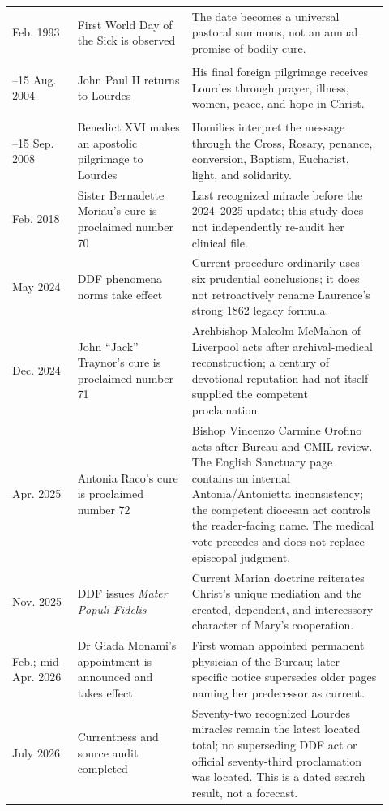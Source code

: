 \begin{longtable}{>{\bfseries\raggedright\arraybackslash}p{0.16\linewidth}>{\raggedright\arraybackslash}p{0.28\linewidth}>{\raggedright\arraybackslash}p{0.48\linewidth}}
11 Feb. 1993 & First World Day of the Sick is observed & The date becomes a universal pastoral summons, not an annual promise of bodily cure.\\
14--15 Aug. 2004 & John Paul II returns to Lourdes & His final foreign pilgrimage receives Lourdes through prayer, illness, women, peace, and hope in Christ.\\
13--15 Sep. 2008 & Benedict XVI makes an apostolic pilgrimage to Lourdes & Homilies interpret the message through the Cross, Rosary, penance, conversion, Baptism, Eucharist, light, and solidarity.\\
11 Feb. 2018 & Sister Bernadette Moriau's cure is proclaimed number 70 & Last recognized miracle before the 2024--2025 update; this study does not independently re-audit her clinical file.\\
19 May 2024 & DDF phenomena norms take effect & Current procedure ordinarily uses six prudential conclusions; it does not retroactively rename Laurence's strong 1862 legacy formula.\\
8 Dec. 2024 & John “Jack” Traynor's cure is proclaimed number 71 & Archbishop Malcolm McMahon of Liverpool acts after archival-medical reconstruction; a century of devotional reputation had not itself supplied the competent proclamation.\\
16 Apr. 2025 & Antonia Raco's cure is proclaimed number 72 & Bishop Vincenzo Carmine Orofino acts after Bureau and CMIL review. The English Sanctuary page contains an internal Antonia/Antonietta inconsistency; the competent diocesan act controls the reader-facing name. The medical vote precedes and does not replace episcopal judgment.\\
4 Nov. 2025 & DDF issues \emph{Mater Populi Fidelis} & Current Marian doctrine reiterates Christ's unique mediation and the created, dependent, and intercessory character of Mary's cooperation.\\
17 Feb.; mid-Apr. 2026 & Dr Giada Monami's appointment is announced and takes effect & First woman appointed permanent physician of the Bureau; later specific notice supersedes older pages naming her predecessor as current.\\
16 July 2026 & Currentness and source audit completed & Seventy-two recognized Lourdes miracles remain the latest located total; no superseding DDF act or official seventy-third proclamation was located. This is a dated search result, not a forecast.\\
\bottomrule
\end{longtable}
\endgroup
